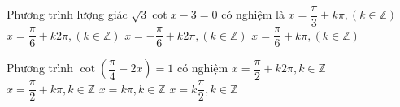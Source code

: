 \begin{ex}%
	Phương trình lượng giác $\sqrt{3}\cot x-3=0$ có nghiệm là
	\choice
	{$x=\dfrac{\pi}{3}+k\pi,\left(k\in \mathbb{Z}\right)$}
	{$x=\dfrac{\pi}{6}+k2\pi,\left(k\in \mathbb{Z}\right)$}
	{$x=-\dfrac{\pi}{6}+k2\pi,\left(k\in \mathbb{Z}\right)$}
	{\True $x=\dfrac{\pi}{6}+k\pi,\left(k\in \mathbb{Z}\right)$}
\end{ex}
\begin{ex}%
	Phương trình $\cot \left(\dfrac{\pi}{4}-2x\right)=1$ có nghiệm
	\choice
	{$x=\dfrac{\pi}{2}+k2\pi,k\in \mathbb{Z}$}
	{$x=\dfrac{\pi}{2}+k\pi,k\in \mathbb{Z}$}
	{$x=k\pi,k\in \mathbb{Z}$}
	{\True $x=k\dfrac{\pi}{2},k\in \mathbb{Z}$}
\end{ex}

